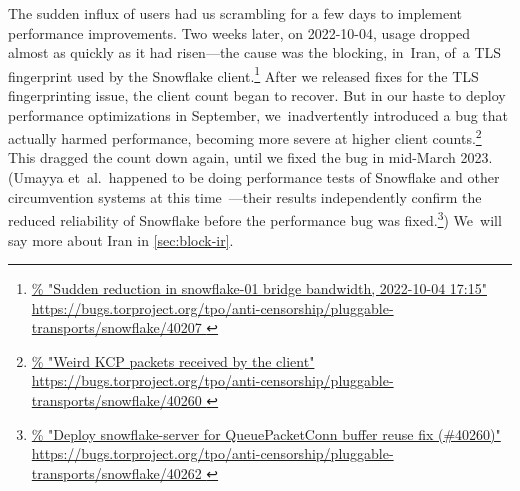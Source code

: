 \documentclass[letterpaper,twocolumn]{article}
\newlength{\urlfootnotesize}
\newcommand{\urlfootnote}[1]{\footnote{
\raggedright\hangindent\footnotemargin%
\fontsize{\urlfootnotesize}{\urlfootnotesize}\selectfont%
\url{#1}
}}
\begin{document}
The sudden influx of users had us scrambling for a few days
to implement performance improvements.
Two weeks later, on \mbox{2022-10-04},
usage dropped almost as quickly as it had risen---the
cause was the blocking, in~Iran, of~a TLS fingerprint
used by the Snowflake client.\urlfootnote{
https://bugs.torproject.org/tpo/anti-censorship/pluggable-transports/snowflake/40207
}
After we released fixes for the TLS fingerprinting issue,
the client count began to recover.
But in our haste to deploy performance optimizations in September,
we~inadvertently introduced a bug that actually harmed performance,
becoming more severe at higher client counts.\urlfootnote{
https://bugs.torproject.org/tpo/anti-censorship/pluggable-transports/snowflake/40260
}
This dragged the count down again,
until we fixed the bug in mid-March 2023.
(Umayya et~al.\ happened to be doing performance tests of Snowflake
and other circumvention systems
at this time~\cite[\S 4.6]{Umayya2023a}---their results
independently confirm the reduced reliability of Snowflake
before the performance bug was fixed.\urlfootnote{
https://bugs.torproject.org/tpo/anti-censorship/pluggable-transports/snowflake/40262
})
We~will say more about Iran
in \autoref{sec:block-ir}.
\end{document}
